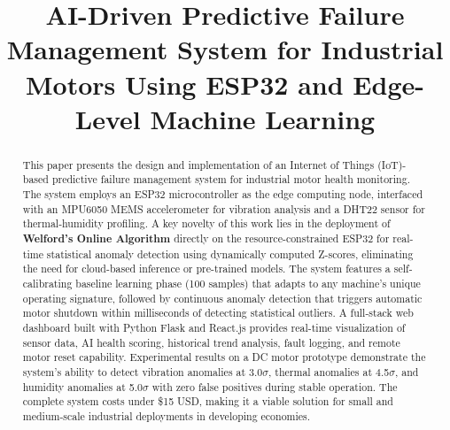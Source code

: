 \documentclass[conference]{IEEEtran}
\begin{document}
\title{AI-Driven Predictive Failure Management System for Industrial Motors Using ESP32 and Edge-Level Machine Learning}

\author{
}

\maketitle

\begin{abstract}
This paper presents the design and implementation of an Internet of Things (IoT)-based predictive failure management system for industrial motor health monitoring. The system employs an ESP32 microcontroller as the edge computing node, interfaced with an MPU6050 MEMS accelerometer for vibration analysis and a DHT22 sensor for thermal-humidity profiling. A key novelty of this work lies in the deployment of \textbf{Welford's Online Algorithm} directly on the resource-constrained ESP32 for real-time statistical anomaly detection using dynamically computed Z-scores, eliminating the need for cloud-based inference or pre-trained models. The system features a self-calibrating baseline learning phase (100 samples) that adapts to any machine's unique operating signature, followed by continuous anomaly detection that triggers automatic motor shutdown within milliseconds of detecting statistical outliers. A full-stack web dashboard built with Python Flask and React.js provides real-time visualization of sensor data, AI health scoring, historical trend analysis, fault logging, and remote motor reset capability. Experimental results on a DC motor prototype demonstrate the system's ability to detect vibration anomalies at 3.0$\sigma$, thermal anomalies at 4.5$\sigma$, and humidity anomalies at 5.0$\sigma$ with zero false positives during stable operation. The complete system costs under \$15 USD, making it a viable solution for small and medium-scale industrial deployments in developing economies.
\end{abstract}
\end{document}
